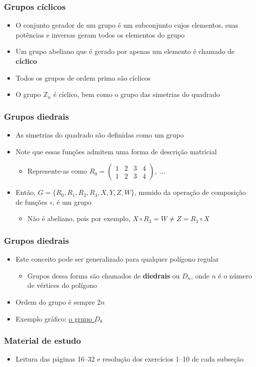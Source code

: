 \documentclass[12pt]{beamer}
\begin{document}
\begin{frame}
  \frametitle{Grupos cíclicos}
  \begin{itemize}
    \item<1-> O conjunto gerador de um grupo é um subconjunto cujos elementos,
        suas potências e inversas geram todos os elementos do grupo
    \item<2-> Um grupo abeliano que é gerado por apenas um elemento é chamado
        de \textbf{cíclico}
    \item<3-> Todos os grupos de ordem prima são cíclicos
    \item<4-> O grupo $\mathbb{Z}_n$ é cíclico, bem como o grupo das simetrias do
        quadrado
  \end{itemize}
\end{frame}

\begin{frame}
  \frametitle{Grupos diedrais}
  \begin{itemize}
    \item<1-> As simetrias do quadrado são definidas como um grupo
    \item<1-> Note que essas funções admitem uma forma de descrição matricial
    \begin{itemize}
      \item<2-> Represente-as como
        $R_{0} =
        \begin{pmatrix}
          1 & 2 & 3 & 4 \\
          1 & 2 & 3 & 4
        \end{pmatrix},\; \dots$
    \end{itemize}
    \item<3-> Então, $G = \{R_{0}, R_{1}, R_{2}, R_{3}, X, Y, Z, W\}$, munido
        da operação de composição de funções $\circ$, é um grupo
    \begin{itemize}
      \item<4-> Não é abeliano, pois por exemplo, $X \circ R_{3} = W \neq Z =
          R_{3} \circ X$
    \end{itemize}
  \end{itemize}
\end{frame}

\begin{frame}
  \frametitle{Grupos diedrais}
  \begin{itemize}
    \item<1-> Este conceito pode ser generalizado para qualquer polígono regular
    \begin{itemize}
      \item Grupos dessa forma são chamados de \textbf{diedrais} ou $D_{n}$,
          onde $n$ é o número de vértices do polígono
    \end{itemize}
    \item<2-> Ordem do grupo é sempre $2n$
    \item<3-> Exemplo gráfico:
        \href{https://upload.wikimedia.org/wikipedia/commons/9/96/Dihedral8.png}{o
          grupo $D_{8}$}
  \end{itemize}
\end{frame}

\begin{frame}
  \frametitle{Material de estudo}
  
  
  \begin{itemize}
    \nocite{Dummit:book:2003}
    \item Leitura das páginas 16--32 e resolução dos exercícios 1--10 de cada
        subseção
  \end{itemize}
\end{frame}
\end{document}

